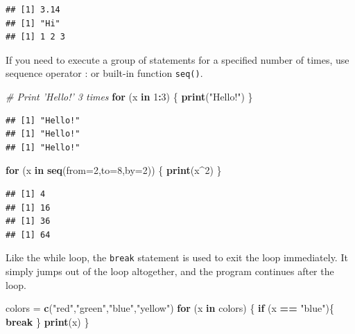 \documentclass[
]{book}
\newenvironment{Shaded}{\begin{snugshade}}{\end{snugshade}}
\newcommand{\CommentTok}[1]{\textcolor[rgb]{0.56,0.35,0.01}{\textit{#1}}}
\newcommand{\ControlFlowTok}[1]{\textcolor[rgb]{0.13,0.29,0.53}{\textbf{#1}}}
\newcommand{\DataTypeTok}[1]{\textcolor[rgb]{0.13,0.29,0.53}{#1}}
\newcommand{\DecValTok}[1]{\textcolor[rgb]{0.00,0.00,0.81}{#1}}
\newcommand{\KeywordTok}[1]{\textcolor[rgb]{0.13,0.29,0.53}{\textbf{#1}}}
\newcommand{\NormalTok}[1]{#1}
\newcommand{\OperatorTok}[1]{\textcolor[rgb]{0.81,0.36,0.00}{\textbf{#1}}}
\newcommand{\StringTok}[1]{\textcolor[rgb]{0.31,0.60,0.02}{#1}}
\begin{document}
\begin{verbatim}
## [1] 3.14
## [1] "Hi"
## [1] 1 2 3
\end{verbatim}

If you need to execute a group of statements for a specified number of times, use sequence operator : or built-in function \texttt{seq()}.

\begin{Shaded}
\begin{Highlighting}[]
\CommentTok{# Print 'Hello!' 3 times}
\ControlFlowTok{for}\NormalTok{ (x }\ControlFlowTok{in} \DecValTok{1}\OperatorTok{:}\DecValTok{3}\NormalTok{) \{}
  \KeywordTok{print}\NormalTok{(}\StringTok{"Hello!"}\NormalTok{)}
\NormalTok{\}}
\end{Highlighting}
\end{Shaded}

\begin{verbatim}
## [1] "Hello!"
## [1] "Hello!"
## [1] "Hello!"
\end{verbatim}

\begin{Shaded}
\begin{Highlighting}[]
\ControlFlowTok{for}\NormalTok{ (x }\ControlFlowTok{in} \KeywordTok{seq}\NormalTok{(}\DataTypeTok{from=}\DecValTok{2}\NormalTok{,}\DataTypeTok{to=}\DecValTok{8}\NormalTok{,}\DataTypeTok{by=}\DecValTok{2}\NormalTok{)) \{}
  \KeywordTok{print}\NormalTok{(x}\OperatorTok{^}\DecValTok{2}\NormalTok{)}
\NormalTok{\}}
\end{Highlighting}
\end{Shaded}

\begin{verbatim}
## [1] 4
## [1] 16
## [1] 36
## [1] 64
\end{verbatim}

Like the while loop, the \texttt{break} statement is used to exit the loop immediately. It simply jumps out of the loop altogether, and the program continues after the loop.

\begin{Shaded}
\begin{Highlighting}[]
\NormalTok{colors =}\StringTok{ }\KeywordTok{c}\NormalTok{(}\StringTok{"red"}\NormalTok{,}\StringTok{"green"}\NormalTok{,}\StringTok{"blue"}\NormalTok{,}\StringTok{"yellow"}\NormalTok{)}
\ControlFlowTok{for}\NormalTok{ (x }\ControlFlowTok{in}\NormalTok{ colors) \{}
  \ControlFlowTok{if}\NormalTok{ (x }\OperatorTok{==}\StringTok{ "blue"}\NormalTok{)\{}
       \ControlFlowTok{break} 
\NormalTok{  \}}
  \KeywordTok{print}\NormalTok{(x)}
\NormalTok{\}}
\end{Highlighting}
\end{Shaded}
\end{document}
